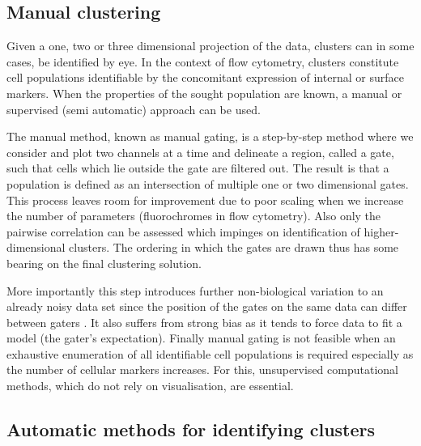 \subsection{Manual clustering}

Given a one, two or three dimensional projection of the data, clusters can in some cases, be identified by eye.
In the context of flow cytometry, clusters constitute cell populations identifiable by the concomitant expression of internal or surface markers.
When the properties of the sought population are known, a manual or supervised (semi automatic) approach can be used.

The manual method, known as manual gating,
is a step-by-step method where we consider and plot two channels at a time and delineate a region, called a gate, such that cells which lie outside the gate are filtered out.
The result is that a population is defined as an intersection of multiple one or two dimensional gates.
This process leaves room for improvement due to poor scaling when we increase the number of parameters (fluorochromes in flow cytometry).
Also only the pairwise correlation can be assessed which impinges
on identification of higher-dimensional clusters.
The ordering in which the gates are drawn thus has some bearing on the final clustering solution.

More importantly this step introduces further non-biological variation to an already noisy data set since the position of the gates
on the same data can differ between gaters \citep{Maecker:2010fg}.
It also suffers from strong bias as it tends to force data to fit a model (the gater's expectation).
Finally manual gating is not feasible when an exhaustive enumeration of all identifiable cell populations is required \citep{Siebert:2010iv,Aghaeepour:2012fq} especially
as the number of cellular markers increases.
For this, unsupervised computational methods, which do not rely on visualisation, are essential.


\subsection{Automatic methods for identifying clusters}

